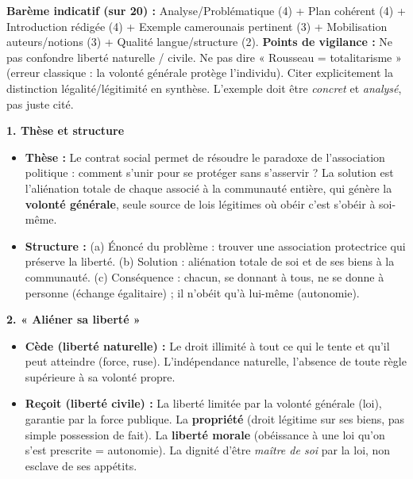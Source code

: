 \documentclass[11pt]{article}
\begin{document}
\begin{corrige}
\textbf{Barème indicatif (sur 20) :} Analyse/Problématique (4) + Plan cohérent (4) + Introduction rédigée (4) + Exemple camerounais pertinent (3) + Mobilisation auteurs/notions (3) + Qualité langue/structure (2).
\textbf{Points de vigilance :} Ne pas confondre liberté naturelle / civile. Ne pas dire « Rousseau = totalitarisme » (erreur classique : la volonté générale protège l'individu). Citer explicitement la distinction légalité/légitimité en synthèse. L'exemple doit être \emph{concret} et \emph{analysé}, pas juste cité.
\end{corrige}

\begin{corrige}
\textbf{1. Thèse et structure}
\begin{itemize}
\item \textbf{Thèse :} Le contrat social permet de résoudre le paradoxe de l'association politique : comment s'unir pour se protéger sans s'asservir ? La solution est l'aliénation totale de chaque associé à la communauté entière, qui génère la \textbf{volonté générale}, seule source de lois légitimes où obéir c'est s'obéir à soi-même.
\item \textbf{Structure :} (a) Énoncé du problème : trouver une association protectrice qui préserve la liberté. (b) Solution : aliénation totale de soi et de ses biens à la communauté. (c) Conséquence : chacun, se donnant à tous, ne se donne à personne (échange égalitaire) ; il n'obéit qu'à lui-même (autonomie).
\end{itemize}

\textbf{2. « Aliéner sa liberté »}
\begin{itemize}
\item \textbf{Cède (liberté naturelle) :} Le droit illimité à tout ce qui le tente et qu'il peut atteindre (force, ruse). L'indépendance naturelle, l'absence de toute règle supérieure à sa volonté propre.
\item \textbf{Reçoit (liberté civile) :} La liberté limitée par la volonté générale (loi), garantie par la force publique. La \textbf{propriété} (droit légitime sur ses biens, pas simple possession de fait). La \textbf{liberté morale} (obéissance à une loi qu'on s'est prescrite = autonomie). La dignité d'être \emph{maître de soi} par la loi, non esclave de ses appétits.
\end{itemize}


\end{corrige}
\end{document}
